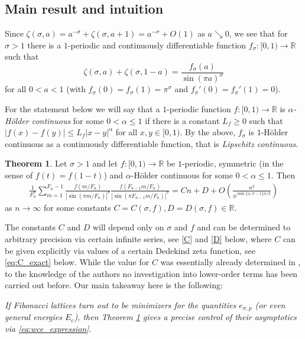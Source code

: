 \documentclass[]{interact}
\newcommand{\bbR}{\mathbb{R}}
\newcommand{\ra}{\rightarrow}
\newcommand{\dx}{\text{d}}
\theoremstyle{definition}
\newtheorem{thm}{Theorem}[section]
\numberwithin{table}{section} %
\numberwithin{figure}{section}
\begin{document}
\subsection{Main result and intuition}

Since $\zeta(\sigma, a) = a^{-\sigma} + \zeta(\sigma, a+1) = a^{-\sigma} + O(1)$ as $a \searrow 0$, we see that for $\sigma > 1$ there is a $1$-periodic and continuously differentiable function $f_\sigma: [0, 1) \ra \bbR$ such that
$$
\zeta(\sigma, a) + \zeta(\sigma, 1-a) = \frac{f_\sigma(a)}{\sin(\pi a)^\sigma}
$$
for all $0 < a < 1$ (with $f_\sigma(0) = f_\sigma(1) = \pi^\sigma$ and $f_\sigma'(0) = f_\sigma'(1) = 0$). %

For the statement below we will say that a $1$-periodic function $f: [0, 1) \rightarrow \bbR$ is \emph{$\alpha$-Hölder continuous} for some $0 < \alpha \leq 1$ if there is a constant $L_f \geq 0$ such that $|f(x)-f(y)| \leq L_f |x-y|^\alpha$ for all $x, y \in [0, 1)$. By the above, $f_\sigma$ is $1$-Hölder continuous as a continuously differentiable function, that is \emph{Lipschitz continuous}.

\begin{thm} \label{thm:asymp}
    Let $\sigma > 1$ and let $f: [0, 1) \ra \bbR$ be $1$-periodic, symmetric (in the sense of $f(t) = f(1-t)$) and $\alpha$-Hölder continuous for some $0 < \alpha \leq 1$. Then
    \begin{align} \label{eq:asymp_expansion}
        \frac1{F_n^\sigma} \sum_{m = 1}^{F_n-1} \frac{f(m/F_n)}{\left|{\sin(\pi m/F_n)}\right|^\sigma} \frac{f(F_{n-1}m/F_n)}{\left|{\sin(\pi F_{n-1}m/F_n)}\right|^\sigma} = Cn + D + O\left(\frac{n^2}{\phi^{\min\{\alpha, \sigma-1\} n/2}}\right)
    \end{align}
    as $n \ra \infty$ for some constants $C=C(\sigma, f), D=D(\sigma, f) \in \bbR$.
\end{thm}

The constants $C$ and $D$ will depend only on $\sigma$ and $f$ and can be determined to arbitrary precision via certain infinite series, see \eqref{C} and \eqref{D} below, where $C$ can be given explicitly via values of a certain Dedekind zeta function, see \eqref{eq:C_exact} below. While the value for $C$ was essentially already determined in \cite{Bor25}, to the knowledge of the authors no investigation into lower-order terms has been carried out before. Our main takeaway here is the following:
\begin{center}
    \textit{If Fibonacci lattices turn out to be minimizers for the quantities $e_{\sigma, p}$ (or even general energies $E_c$), then Theorem \ref{thm:asymp} gives a precise control of their asymptotics via \eqref{eq:wce_expression}.}
\end{center}
\end{document}
